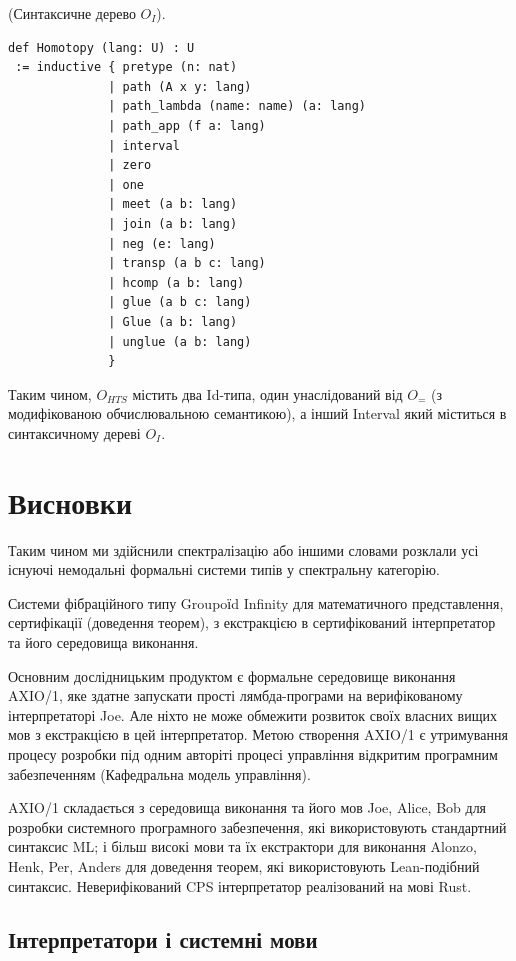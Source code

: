 \begin{definition} (Синтаксичне дерево $O_I$).
\begin{lstlisting}
def Homotopy (lang: U) : U
 := inductive { pretype (n: nat)
              | path (A x y: lang)
              | path_lambda (name: name) (a: lang)
              | path_app (f a: lang)
              | interval
              | zero
              | one
              | meet (a b: lang)
              | join (a b: lang)
              | neg (e: lang)
              | transp (a b c: lang)
              | hcomp (a b: lang)
              | glue (a b c: lang)
              | Glue (a b: lang)
              | unglue (a b: lang)
              }
\end{lstlisting}
\end{definition}

Таким чином,
$O_{HTS}$ містить два Id-типа, один унаслідований від $O_=$ (з модифікованою
обчислювальною семантикою), а інший Interval який міститься в синтаксичному дереві $O_I$.

\newpage
\section{Висновки}

Таким чином ми здійснили спектралізацію або іншими словами розклали усі
існуючі немодальні формальні системи типів у спектральну категорію.

Системи фібраційного типу Groupoїd Infinity для математичного представлення,
сертифікації (доведення теорем), з екстракцією в сертифікований інтерпретатор
та його середовища виконання.

Основним дослідницьким продуктом є формальне середовище виконання AXIO/1,
яке здатне запускати прості лямбда-програми на верифікованому інтерпретаторі Joe.
Але ніхто не може обмежити розвиток своїх власних вищих мов з екстракцією в цей інтерпретатор.
Метою створення AXIO/1 є утримування процесу розробки під одним авторіті процесі управління
відкритим програмним забезпеченням (Кафедральна модель управління).

AXIO/1 складається з середовища виконання та його мов Joe, Alice, Bob для розробки системного
програмного забезпечення, які використовують стандартний синтаксис ML; і більш високі
мови та їх екстрактори для виконання Alonzo, Henk, Per, Anders для доведення теорем,
які використовують Lean-подібний синтаксис. Неверифікований CPS інтерпретатор реалізований
на мові Rust.


\newpage
\subsection*{Інтерпретатори і системні мови}

